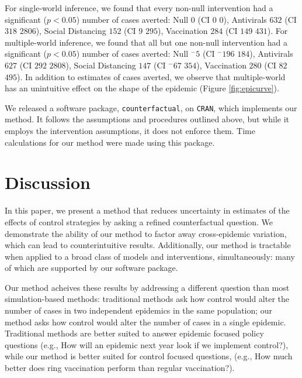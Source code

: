 \documentclass[PTRSB]{rsos}
\renewcommand{\neg}{{}^-}
\begin{document}
\begin{multicols}{2}
For single-world inference, we found that every non-null intervention had a significant ($p<0.05$) number of cases averted: Null $ 0 $ (CI $ 0 $ \textemdash $ 0 $), Antivirals $ 632 $ (CI $ 318 $ \textemdash $ 2806 $), Social Distancing $ 152 $ (CI $ 9 $ \textemdash $ 295 $), Vaccination $ 284 $ (CI $ 149 $ \textemdash $ 431 $).
For multiple-world inference, we found that all but one non-null intervention had a significant ($p<0.05$) number of cases averted: Null $ \neg5 $ (CI $ \neg196 $ \textemdash $ 184 $), Antivirals $ 627 $ (CI $ 292 $ \textemdash $ 2808 $), Social Distancing $ 147 $ (CI $ \neg67 $ \textemdash $ 354 $), Vaccination $ 280 $ (CI $ 82 $ \textemdash $ 495 $).
In addition to estimates of cases averted, we observe that multiple-world has an unintuitive effect on the shape of the epidemic (Figure \ref{fig:epicurve}).

We released a software package, \texttt{counterfactual}, on \texttt{CRAN}, %
which implements our method.
It follows the assumptions and procedures outlined above, but while it employs the intervention assumptions, it does not enforce them.
Time calculations for our method were made using this package.

\section{Discussion}
In this paper, we present a method that reduces uncertainty in estimates of the effects of control strategies by asking a refined counterfactual question.
We demonstrate the ability of our method to factor away cross-epidemic variation, which can lead to counterintuitive results.
Additionally, our method is tractable when applied to a broad class of models and interventions, simultaneously: many of which are supported by our software package.

Our method acheives these results by addressing a different question than most simulation-based methods: traditional methods ask how control would alter the number of cases in two independent epidemics in the same population; our method asks how control would alter the number of cases in a single epidemic.
Traditional methods are better suited to answer epidemic focused policy questions (e.g., How will an epidemic next year look if we implement control?), while our method is better suited for control focused questions, (e.g., How much better does ring vaccination perform than regular vaccination?).


\end{multicols}
\end{document}
